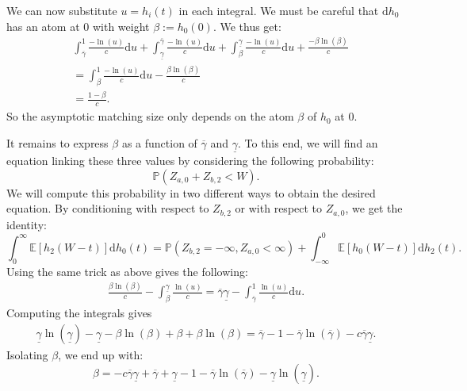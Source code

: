 \documentclass[11pt]{article}
\begin{document}
We can now substitute $u=h_i(t)$ in each integral. We must be careful that $\mathrm{d}h_0$ has an atom at $0$ with weight $\beta:=h_0(0)$. We thus get:
\begin{align}
    &\int_{\overline{\gamma}}^{1} \frac{-\ln(u)}{c}\mathrm{d}u + \int_{\underline{\gamma}}^{\overline{\gamma}} \frac{-\ln(u)}{c}\mathrm{d}u + \int_{\beta}^{\underline{\gamma}} \frac{-\ln(u)}{c} \mathrm{d}u  + \frac{-\beta\ln(\beta)}{c} \nonumber\\
    &=\int_{\beta}^{1}\frac{-\ln(u)}{c}\mathrm{d}u-\frac{\beta\ln(\beta)}{c} \nonumber \\
    &= \frac{1-\beta}{c}. \label{eq:ERtailleatomzero}
\end{align}
So the asymptotic matching size only depends on the atom $\beta$ of $h_0$ at $0$.

It remains to express $\beta$ as a function of $\overline{\gamma}$ and $\underline{\gamma}$. To this end, we will find an equation linking these three values by considering the following probability:
\begin{equation*}
    \mathbb{P}(Z_{a,0}+Z_{b,2} < W).
\end{equation*}
We will compute this probability in two different ways to obtain the desired equation. By conditioning with respect to $Z_{b,2}$ or with respect to $Z_{a,0}$, we get the identity:
\begin{equation*}
    \int_{0}^{\infty} \mathbb{E}\left[ h_2(W-t) \right]\mathrm{d}h_0(t)=\mathbb{P}(Z_{b,2}=-\infty, Z_{a,0}<\infty)+\int_{-\infty}^{0} \mathbb{E} \left[ h_0(W-t) \right]\mathrm{d}h_2(t) .
\end{equation*}
Using the same trick as above gives the following:
\begin{align*}
    \frac{\beta\ln(\beta)}{c}-\int_{\beta}^{\underline{\gamma}}\frac{\ln(u)}{c}  = \overline{\gamma}\underline{\gamma}-  \int_{\overline{\gamma}}^{1} \frac{\ln(u)}{c} \mathrm{d}u .
\end{align*}
Computing the integrals gives
\begin{align*}
\underline{\gamma}\ln(\underline{\gamma})-\underline{\gamma} - \beta\ln(\beta)+\beta + \beta\ln(\beta)= \overline{\gamma}-1-\overline{\gamma}\ln(\overline{\gamma})- c\overline{\gamma}\underline{\gamma}.
\end{align*}
Isolating $\beta$, we end up with:
\begin{equation*}
\beta=-c\overline{\gamma}\underline{\gamma}+\overline{\gamma}+\underline{\gamma}-1-\overline{\gamma}\ln(\overline{\gamma})-\underline{\gamma}\ln(\underline{\gamma}).
\end{equation*}
\end{document}
